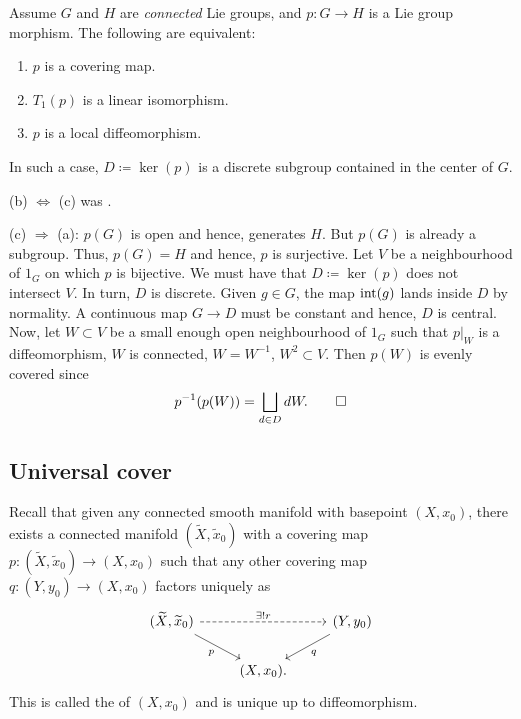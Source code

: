 \documentclass[12pt]{article}
\begin{document}
\begin{lem} \label{lem:covering-local-diffeo-equivalent}
	Assume $G$ and $H$ are \emph{connected} Lie groups, and $p \colon G \to H$ is a Lie group morphism. The following are equivalent:
	\begin{enumerate}[label=(\alph*)]
		\item $p$ is a covering map.
		\item $T_{1}(p)$ is a linear isomorphism.
		\item $p$ is a local diffeomorphism.
	\end{enumerate}
	In such a case, $D \coloneqq \ker(p)$ is a discrete subgroup contained in the center of $G$.
\end{lem}
\begin{sketch}
	(b) $\Leftrightarrow$ (c) was .

	(c) $\Rightarrow$ (a): $p(G)$ is open and hence, generates $H$. 
	But $p(G)$ is already a subgroup. 
	Thus, $p(G) = H$ and hence, $p$ is surjective. 
	Let $V$ be a neighbourhood of $1_{G}$ on which $p$ is bijective.
	We must have that $D \coloneqq \ker(p)$ does not intersect $V$. 
	In turn, $D$ is discrete. \newline
	Given $g \in G$, the map $\operatorname{int}(g)$ lands inside $D$ by normality. 
	A continuous map $G \to D$ must be constant and hence, $D$ is central. \newline
	Now, let $W \subset V$ be a small enough open neighbourhood of $1_{G}$ such that $p|_{W}$ is a diffeomorphism, $W$ is connected, $W = W^{-1}$, $W^{2} \subset V$. 
	Then $p(W)$ is evenly covered since
	\begin{equation*} 
		p^{-1}(p(W)) = \bigsqcup_{d \in D} dW. \qedhere
	\end{equation*}
\end{sketch}

\subsection{Universal cover}

Recall that given any connected smooth manifold with basepoint $(X, x_{0})$, 
there exists a connected manifold $(\widetilde{X}, \widetilde{x}_{0})$ 
with a covering map $p \colon (\widetilde{X}, \widetilde{x}_{0}) \to (X, x_{0})$ 
such that any other covering map $q \colon (Y, y_{0}) \to (X, x_{0})$ factors uniquely as
\begin{equation*} 
	\begin{tikzcd}
		{(\widetilde{X}, \widetilde{x}_{0})} \arrow[rd, "p"'] \arrow[rr, "\exists!r", dashed] & & {(Y, y_{0})} \arrow[ld, "q"] \\
		& {(X, x_{0}).} &                             
	\end{tikzcd}
\end{equation*}
This is called the  of $(X, x_{0})$ and is unique up to diffeomorphism.
\end{document}
